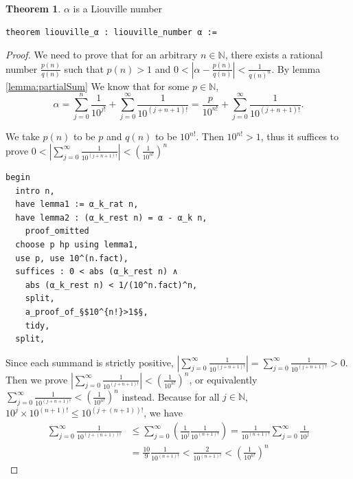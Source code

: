 \documentclass{report}
\theoremstyle{definition}
\newtheorem{theorem}{Theorem}[section]
\begin{document}
\begin{theorem}\label{thm:alphaTrans}
$\alpha$ is a Liouville number
\begin{verbatim}
theorem liouville_α : liouville_number α :=
\end{verbatim}
\end{theorem}
\begin{proof}
We need to prove that for an arbitrary $n\in\mathbb N$, there exists a rational number $\frac{p(n)}{q(n)}$ such that $p(n)>1$ and $0 < \left|\alpha-\frac{p(n)}{q(n)}\right|<\frac{1}{q(n)^n}$. By lemma \ref{lemma:partialSum} We know that for some $p\in\mathbb N$,
$$
\alpha=\sum_{j=0}^n\frac1{10^{j!}}+\sum_{j=0}^\infty\frac1{10^{(j+n+1)!}}=\frac p{10^{n!}}+\sum_{j=0}^\infty\frac1{10^{(j+n+1)!}}.
$$

We take $p(n)$ to be $p$ and $q(n)$ to be $10^{n!}$. Then $10^{n!}>1$, thus it suffices to prove $0<\left|\sum_{j=0}^\infty\frac1{10^{(j+n+1)!}}\right|<\left(\frac1{10^{n!}}\right)^n$

\begin{verbatim}
begin
  intro n,
  have lemma1 := α_k_rat n,
  have lemma2 : (α_k_rest n) = α - α_k n,
    proof_omitted
  choose p hp using lemma1,
  use p, use 10^(n.fact),
  suffices : 0 < abs (α_k_rest n) ∧ 
    abs (α_k_rest n) < 1/(10^n.fact)^n,
    split,
    a_proof_of_§$10^{n!}>1$§,
    tidy,
  split,
\end{verbatim}

Since each summand is strictly positive, $\left|\sum_{j=0}^\infty\frac1{10^{(j+n+1)!}}\right|=\sum_{j=0}^\infty\frac1{10^{(j+n+1)!}} > 0$. Then we prove $\left|\sum_{j=0}^\infty\frac1{10^{(j+n+1)!}}\right|<\left(\frac1{10^{n!}}\right)^n$, or equivalently $\sum_{j=0}^\infty\frac1{10^{(j+n+1)!}}<\left(\frac1{10^{n!}}\right)^n$ instead. Because for all $j\in\mathbb N$, $10^j\times 10^{(n+1)!}\le 10^{(j+(n+1))!}$, we have
\begin{equation*}
\begin{aligned}
\sum_{j=0}^\infty\frac1{10^{(j+(n+1))!}}&\le\sum_{j=0}^\infty\left(\frac1{10^j}\frac1{10^{(n+1)!}}\right)=\frac{1}{10^{(n+1)!}}\sum_{j=0}^\infty\frac1{10^j}\\
&=\frac{10} 9\frac{1}{10^{(n+1)!}} < \frac2{10^{(n+1)!}}<\left(\frac1{10^{n!}}\right)^n
\end{aligned}
\end{equation*}


\end{proof}
\end{document}
